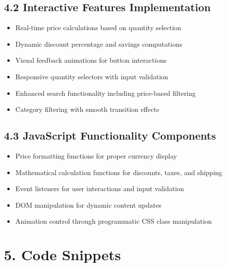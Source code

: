 \documentclass[a4paper,12pt]{article}
\begin{document}
\subsection*{4.2 Interactive Features Implementation}
\begin{itemize}
  \item Real-time price calculations based on quantity selection
  \item Dynamic discount percentage and savings computations
  \item Visual feedback animations for button interactions
  \item Responsive quantity selectors with input validation
  \item Enhanced search functionality including price-based filtering
  \item Category filtering with smooth transition effects
\end{itemize}

\subsection*{4.3 JavaScript Functionality Components}
\begin{itemize}
  \item Price formatting functions for proper currency display
  \item Mathematical calculation functions for discounts, taxes, and shipping
  \item Event listeners for user interactions and input validation
  \item DOM manipulation for dynamic content updates
  \item Animation control through programmatic CSS class manipulation
\end{itemize}

\section*{5. Code Snippets}
\end{document}

